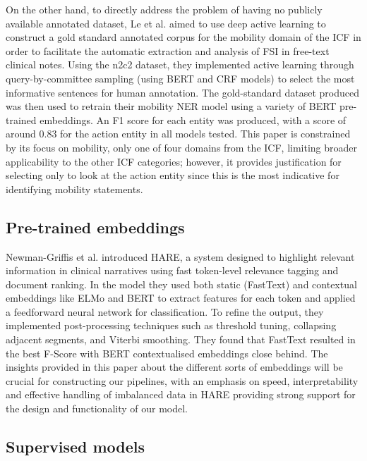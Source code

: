 On the other hand, to directly address the problem of having no publicly available annotated dataset, Le et al. \cite{le2023} aimed to use deep active learning to construct a gold standard annotated corpus for the mobility domain of the ICF in order to facilitate the automatic extraction and analysis of FSI in free-text clinical notes. Using the n2c2 dataset, they implemented active learning through query-by-committee sampling (using BERT and CRF models) to select the most informative sentences for human annotation. The gold-standard dataset produced was then used to retrain their mobility NER model using a variety of BERT pre-trained embeddings. An F1 score for each entity was produced, with a score of around 0.83 for the action entity in all models tested. This paper is constrained by its focus on mobility, only one of four domains from the ICF, limiting broader applicability to the other ICF categories; however, it provides justification for selecting only to look at the action entity since this is the most indicative for identifying mobility statements.

\subsection{Pre-trained embeddings}

Newman-Griffis et al. \cite{newman-griffis2019hare} introduced HARE, a system designed to highlight relevant information in clinical narratives using fast token-level relevance tagging and document ranking. In the model they used both static (FastText) and contextual embeddings like ELMo and BERT to extract features for each token and applied a feedforward neural network for classification. To refine the output, they implemented post-processing techniques such as threshold tuning, collapsing adjacent segments, and Viterbi smoothing. They found that FastText resulted in the best F-Score with BERT contextualised embeddings close behind. The insights provided in this paper about the different sorts of embeddings will be crucial for constructing our pipelines, with an emphasis on speed, interpretability and effective handling of imbalanced data in HARE providing strong support for the design and functionality of our model. \\

\subsection{Supervised models}

